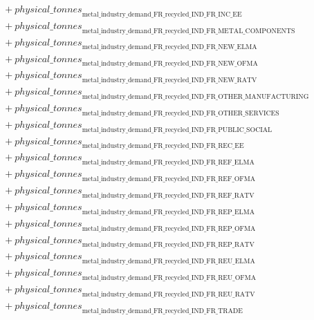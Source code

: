 \documentclass[11pt]{article}
\begin{document}
\begin{align*}
&\quad {}+ {physical\_tonnes}_{\text{metal\_industry\_demand\_FR\_recycled\_IND\_FR\_INC\_EE}}\\
&\quad {}+ {physical\_tonnes}_{\text{metal\_industry\_demand\_FR\_recycled\_IND\_FR\_METAL\_COMPONENTS}}\\
&\quad {}+ {physical\_tonnes}_{\text{metal\_industry\_demand\_FR\_recycled\_IND\_FR\_NEW\_ELMA}}\\
&\quad {}+ {physical\_tonnes}_{\text{metal\_industry\_demand\_FR\_recycled\_IND\_FR\_NEW\_OFMA}}\\
&\quad {}+ {physical\_tonnes}_{\text{metal\_industry\_demand\_FR\_recycled\_IND\_FR\_NEW\_RATV}}\\
&\quad {}+ {physical\_tonnes}_{\text{metal\_industry\_demand\_FR\_recycled\_IND\_FR\_OTHER\_MANUFACTURING}}\\
&\quad {}+ {physical\_tonnes}_{\text{metal\_industry\_demand\_FR\_recycled\_IND\_FR\_OTHER\_SERVICES}}\\
&\quad {}+ {physical\_tonnes}_{\text{metal\_industry\_demand\_FR\_recycled\_IND\_FR\_PUBLIC\_SOCIAL}}\\
&\quad {}+ {physical\_tonnes}_{\text{metal\_industry\_demand\_FR\_recycled\_IND\_FR\_REC\_EE}}\\
&\quad {}+ {physical\_tonnes}_{\text{metal\_industry\_demand\_FR\_recycled\_IND\_FR\_REF\_ELMA}}\\
&\quad {}+ {physical\_tonnes}_{\text{metal\_industry\_demand\_FR\_recycled\_IND\_FR\_REF\_OFMA}}\\
&\quad {}+ {physical\_tonnes}_{\text{metal\_industry\_demand\_FR\_recycled\_IND\_FR\_REF\_RATV}}\\
&\quad {}+ {physical\_tonnes}_{\text{metal\_industry\_demand\_FR\_recycled\_IND\_FR\_REP\_ELMA}}\\
&\quad {}+ {physical\_tonnes}_{\text{metal\_industry\_demand\_FR\_recycled\_IND\_FR\_REP\_OFMA}}\\
&\quad {}+ {physical\_tonnes}_{\text{metal\_industry\_demand\_FR\_recycled\_IND\_FR\_REP\_RATV}}\\
&\quad {}+ {physical\_tonnes}_{\text{metal\_industry\_demand\_FR\_recycled\_IND\_FR\_REU\_ELMA}}\\
&\quad {}+ {physical\_tonnes}_{\text{metal\_industry\_demand\_FR\_recycled\_IND\_FR\_REU\_OFMA}}\\
&\quad {}+ {physical\_tonnes}_{\text{metal\_industry\_demand\_FR\_recycled\_IND\_FR\_REU\_RATV}}\\
&\quad {}+ {physical\_tonnes}_{\text{metal\_industry\_demand\_FR\_recycled\_IND\_FR\_TRADE}}\\

\end{align*}
\end{document}
